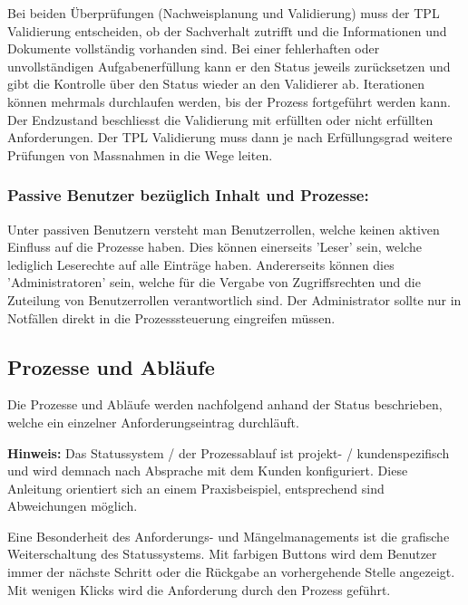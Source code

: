 Bei beiden Überprüfungen (Nachweisplanung und Validierung) muss der TPL Validierung entscheiden, ob der Sachverhalt zutrifft und die Informationen und Dokumente vollständig vorhanden sind. Bei einer fehlerhaften oder unvollständigen Aufgabenerfüllung kann er den Status jeweils zurücksetzen und gibt die Kontrolle über den Status wieder an den Validierer ab. Iterationen können mehrmals durchlaufen werden, bis der Prozess fortgeführt werden kann. \\

Der Endzustand beschliesst die Validierung mit erfüllten oder nicht erfüllten Anforderungen. Der TPL Validierung muss dann je nach Erfüllungsgrad weitere Prüfungen von Massnahmen in die Wege leiten.

\subsubsection{Passive Benutzer bezüglich Inhalt und Prozesse:} 

Unter passiven Benutzern versteht man Benutzerrollen, welche keinen aktiven Einfluss auf die Prozesse haben. Dies können einerseits 'Leser' sein, welche lediglich Leserechte auf alle Einträge haben. Andererseits können dies 'Administratoren' sein, welche für die Vergabe von Zugriffsrechten und die Zuteilung von Benutzerrollen verantwortlich sind. Der Administrator sollte nur in Notfällen direkt in die Prozesssteuerung eingreifen müssen.

\subsection{Prozesse und Abläufe}

Die Prozesse und Abläufe werden nachfolgend anhand der Status beschrieben, welche ein einzelner Anforderungseintrag durchläuft. 

\vspace{\baselineskip}

\textbf{Hinweis:} Das Statussystem / der Prozessablauf ist projekt- / kundenspezifisch und wird demnach nach Absprache mit dem Kunden konfiguriert. Diese Anleitung orientiert sich an einem Praxisbeispiel, entsprechend sind Abweichungen möglich.

\vspace{\baselineskip}

Eine Besonderheit des Anforderungs- und Mängelmanagements ist die grafische Weiterschaltung des Statussystems. Mit farbigen Buttons wird dem Benutzer immer der nächste Schritt oder die Rückgabe an vorhergehende Stelle angezeigt. Mit wenigen Klicks wird die Anforderung durch den Prozess geführt.

